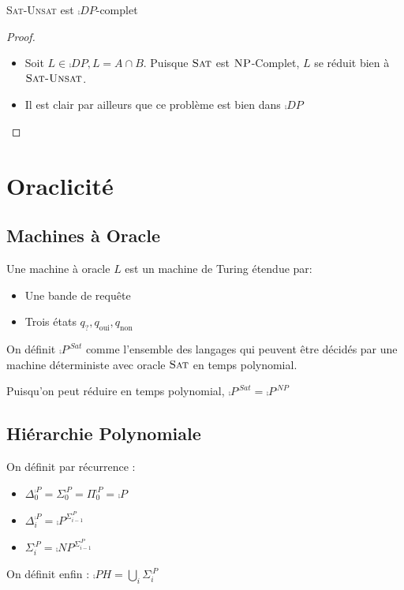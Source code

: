 \documentclass{cours}
\begin{document}
\begin{proposition}
    \textsc{Sat-Unsat} est $\comp{DP}$-complet
\end{proposition}
\begin{proof}
    \begin{itemize}
        \item Soit $L \in \comp{DP}, L = A\cap B$. Puisque $\textsc{Sat}$ est $\textsc{NP}$-Complet, $L$ se réduit bien à $\textsc{Sat-Unsat}$. 
        \item Il est clair par ailleurs que ce problème est bien dans $\comp{DP}$
    \end{itemize}
\end{proof}

\section{Oraclicité}
\subsection{Machines à Oracle}
\begin{definition}
    Une machine à oracle $L$ est un machine de Turing étendue par: 
    \begin{itemize}
        \item Une bande de requête
        \item Trois états $q_{?}, q_{\text{oui}}, q_{\text{non}}$
    \end{itemize}
\end{definition}

\begin{definition}
    On définit $\comp{P}^{\comp{Sat}}$ comme l'ensemble des langages qui peuvent être décidés par une machine déterministe avec oracle $\textsc{Sat}$ en temps polynomial. 
\end{definition}

\begin{proposition}
    Puisqu'on peut réduire  en temps polynomial, $\comp{P}^{\comp{Sat}} = \comp{P}^{\comp{NP}}$
\end{proposition}

\subsection{Hiérarchie Polynomiale}
\begin{definition}
    On définit par récurrence : 
    \begin{itemize}
        \item $\Delta_{0}^{\comp{P}} = \Sigma_{0}^{\comp{P}} = \Pi_{0}^{\comp{P}} = \comp{P}$
        \item $\Delta_{i}^{\comp{P}} = \comp{P}^{\Sigma_{i - 1}^{\comp{P}}}$
        \item $\Sigma_{i}^{\comp{P}} = \comp{NP}^{\Sigma_{i - 1}^{\comp{P}}}$
    \end{itemize}
    On définit enfin : $\comp{PH} = \bigcup_{i}\Sigma_{i}^{\comp{P}}$
\end{definition}
\end{document}

